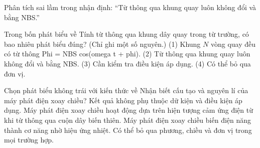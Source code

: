 \begin{bt}
Phân tích sai lầm trong nhận định: “Từ thông qua khung quay luôn không đổi và bằng NBS.”
\end{bt}

\begin{ex}
Trong bốn phát biểu về Tính từ thông qua khung dây quay trong từ trường, có bao nhiêu phát biểu đúng? (Chỉ ghi một số nguyên.) (1) Khung $N$ vòng quay đều có từ thông Phi = NBS cos(omega t + phi). (2) Từ thông qua khung quay luôn không đổi và bằng NBS. (3) Cần kiểm tra điều kiện áp dụng. (4) Có thể bỏ qua đơn vị.
\end{ex}

\begin{ex}
Chọn phát biểu không trái với kiến thức về Nhận biết cấu tạo và nguyên lí của máy phát điện xoay chiều?
\choice
{Kết quả không phụ thuộc dữ kiện và điều kiện áp dụng.}
{\True Máy phát điện xoay chiều hoạt động dựa trên hiện tượng cảm ứng điện từ khi từ thông qua cuộn dây biến thiên.}
{Máy phát điện xoay chiều biến điện năng thành cơ năng nhờ hiệu ứng nhiệt.}
{Có thể bỏ qua phương, chiều và đơn vị trong mọi trường hợp.}
\end{ex}

